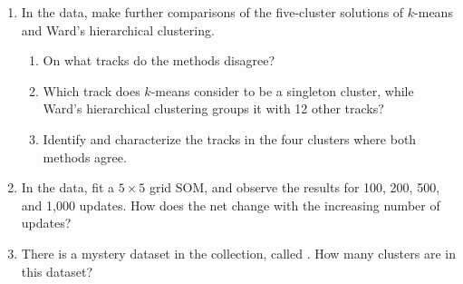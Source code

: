 \begin{enumerate}
\item In the  data, make further comparisons of the five-cluster
solutions of $k$-means and Ward's hierarchical clustering.
\begin{enumerate}
\item On what tracks do the methods disagree?
\item Which track does $k$-means consider to be a singleton cluster,
while Ward's hierarchical clustering groups it with 12 other tracks?
\item Identify and  characterize the tracks in the four clusters where
both methods agree.
\end{enumerate}

\item In the  data, fit a $5\times 5$ grid SOM, and
observe the results for 100, 200, 500, and 1,000 updates. How does the
net change with the increasing number of updates?

\item There is a mystery dataset in the collection, called 
. How many clusters are in this dataset?

\end{enumerate}
